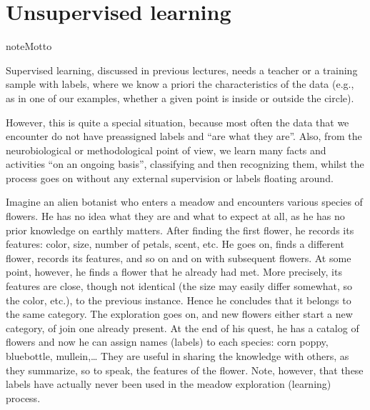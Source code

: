 \documentclass[letterpaper,10pt,english]{jupyterBook}
\begin{document}
\chapter{Unsupervised learning}
\label{\detokenize{docs/unsupervised:unsupervised-learning}}\label{\detokenize{docs/unsupervised:un-lab}}\label{\detokenize{docs/unsupervised::doc}}
\begin{sphinxadmonition}{note}{Motto}

\sphinxAtStartPar
{}


\end{sphinxadmonition}

\sphinxAtStartPar
Supervised learning, discussed in previous lectures, needs a teacher or a training sample with labels, where we know a priori the characteristics of the data (e.g., as in one of our examples, whether a given point is inside or outside the circle).

\sphinxAtStartPar
However, this is quite a special situation, because most often the data that we encounter do not have preassigned labels and “are what they are”. Also, from the neurobiological or methodological point of view, we learn many facts and activities “on an ongoing basis”, classifying and then recognizing them, whilst the process goes on without any external supervision or labels floating around.

\sphinxAtStartPar
Imagine an alien botanist who enters a meadow and encounters various species of flowers. He has no idea what they are and what to expect at all, as he has no prior knowledge on earthly matters. After finding the first flower, he records its features: color, size, number of petals, scent, etc. He goes on, finds a different flower, records its features, and so on and on with subsequent flowers. At some point, however, he finds a flower that he already had met. More precisely, its features are close, though not identical (the size may easily differ somewhat, so the color, etc.), to the previous instance. Hence he concludes that it belongs to the same category. The exploration goes on, and new flowers either start a new category, of join one already present. At the end of his quest, he has a catalog of flowers and now he can assign names (labels) to each species: corn poppy, bluebottle, mullein,…  They are useful in sharing the knowledge with others, as they summarize, so to speak, the features of the flower. Note, however, that these labels have actually never been used in the meadow exploration (learning) process.
\end{document}
